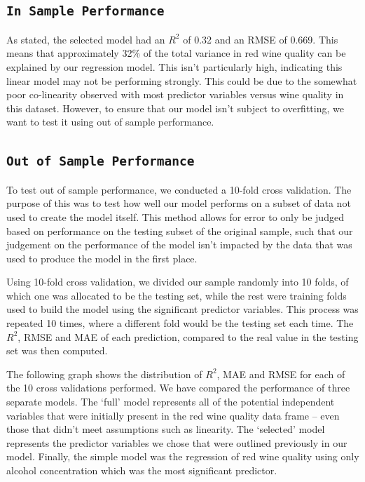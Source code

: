 \documentclass[letterpaper,8pt,twocolumn,twoside,]{pinp}
\begin{document}
\hypertarget{in-sample-performance}{%
\subsection{\texorpdfstring{\texttt{In\ Sample\ Performance}}{In Sample Performance}}\label{in-sample-performance}}

As stated, the selected model had an \(R^2\) of 0.32 and an RMSE of
0.669. This means that approximately 32\% of the total variance in red
wine quality can be explained by our regression model. This isn't
particularly high, indicating this linear model may not be performing
strongly. This could be due to the somewhat poor co-linearity observed
with most predictor variables versus wine quality in this dataset.
However, to ensure that our model isn't subject to overfitting, we want
to test it using out of sample performance.

\hypertarget{out-of-sample-performance}{%
\subsection{\texorpdfstring{\texttt{Out\ of\ Sample\ Performance}}{Out of Sample Performance}}\label{out-of-sample-performance}}

To test out of sample performance, we conducted a 10-fold cross
validation. The purpose of this was to test how well our model performs
on a subset of data not used to create the model itself. This method
allows for error to only be judged based on performance on the testing
subset of the original sample, such that our judgement on the
performance of the model isn't impacted by the data that was used to
produce the model in the first place.

Using 10-fold cross validation, we divided our sample randomly into 10
folds, of which one was allocated to be the testing set, while the rest
were training folds used to build the model using the significant
predictor variables. This process was repeated 10 times, where a
different fold would be the testing set each time. The \(R^2\), RMSE and
MAE of each prediction, compared to the real value in the testing set
was then computed.

The following graph shows the distribution of \(R^2\), MAE and RMSE for
each of the 10 cross validations performed. We have compared the
performance of three separate models. The `full' model represents all of
the potential independent variables that were initially present in the
red wine quality data frame -- even those that didn't meet assumptions
such as linearity. The `selected' model represents the predictor
variables we chose that were outlined previously in our model. Finally,
the simple model was the regression of red wine quality using only
alcohol concentration which was the most significant predictor.
\end{document}
